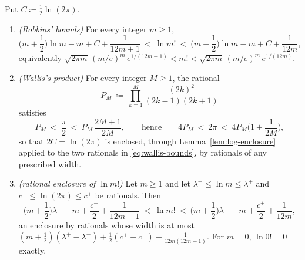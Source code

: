 \begin{lemma}\label{lem:stirling-enclosure}
Put $C\coloneqq\tfrac12\ln(2\pi)$.
\begin{enumerate}[label=(\roman*),leftmargin=2.2em]
\item \emph{(Robbins' bounds)} For every integer $m\ge1$,
\begin{equation}\label{eq:robbins}
  \Big(m+\frac12\Big)\ln m-m+C+\frac{1}{12m+1}
  \ <\ \ln m!\ <\
  \Big(m+\frac12\Big)\ln m-m+C+\frac{1}{12m},
\end{equation}
equivalently
$\sqrt{2\pi m}\,(m/e)^{m}\,e^{1/(12m+1)}<m!<\sqrt{2\pi m}\,(m/e)^{m}\,e^{1/(12m)}$.
\item \emph{(Wallis's product)} For every integer $M\ge1$, the rational
\begin{equation}\label{eq:wallis-partial}
  P_M\ \coloneqq\ \prod_{k=1}^{M}\frac{(2k)^{2}}{(2k-1)(2k+1)}
\end{equation}
satisfies
\begin{equation}\label{eq:wallis-bounds}
  P_M\ <\ \frac{\pi}{2}\ <\ P_M\,\frac{2M+1}{2M},
  \qquad\text{hence}\qquad
  4P_M\ <\ 2\pi\ <\ 4P_M\Big(1+\frac{1}{2M}\Big),
\end{equation}
so that $2C=\ln(2\pi)$ is enclosed, through
Lemma~\ref{lem:log-enclosure} applied to the two rationals in
\eqref{eq:wallis-bounds}, by rationals of any prescribed width.
\item \emph{(rational enclosure of $\ln m!$)} Let $m\ge1$ and let
$\lambda^{-}\le\ln m\le\lambda^{+}$ and $c^{-}\le\ln(2\pi)\le c^{+}$ be
rationals. Then
\begin{equation}\label{eq:lnfact-enclosure}
  \Big(m+\frac12\Big)\lambda^{-}-m+\frac{c^{-}}{2}+\frac{1}{12m+1}
  \ <\ \ln m!\ <\
  \Big(m+\frac12\Big)\lambda^{+}-m+\frac{c^{+}}{2}+\frac{1}{12m},
\end{equation}
an enclosure by rationals whose width is at most
$(m+\tfrac12)(\lambda^{+}-\lambda^{-})+\tfrac12(c^{+}-c^{-})
+\tfrac{1}{12m(12m+1)}$. For $m=0$, $\ln 0!=0$ exactly.
\end{enumerate}
\end{lemma}

